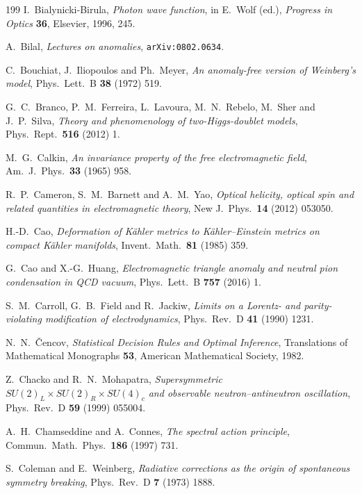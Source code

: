 \begin{thebibliography}{199}
 I.~Bialynicki-Birula, \emph{Photon wave function}, in E.~Wolf (ed.), \emph{Progress in Optics} \textbf{36}, Elsevier, 1996, 245.

 A.~Bilal, \emph{Lectures on anomalies}, \texttt{arXiv:0802.0634}.

 C.~Bouchiat, J.~Iliopoulos and Ph.~Meyer, \emph{An anomaly-free version of Weinberg's model}, Phys.~Lett.~B \textbf{38} (1972) 519.

 G.~C.~Branco, P.~M.~Ferreira, L.~Lavoura, M.~N.~Rebelo, M.~Sher and J.~P.~Silva, \emph{Theory and phenomenology of two-Higgs-doublet models},
Phys.~Rept.~\textbf{516} (2012) 1.

 M.~G.~Calkin, \emph{An invariance property of the free electromagnetic field}, Am.~J.~Phys.~\textbf{33} (1965) 958.

 R.~P.~Cameron, S.~M.~Barnett and A.~M.~Yao, \emph{Optical helicity, optical spin and related quantities in electromagnetic theory},
New J.~Phys.~\textbf{14} (2012) 053050.

 H.-D.~Cao, \emph{Deformation of K\"ahler metrics to K\"ahler--Einstein metrics on compact K\"ahler manifolds}, Invent.~Math.~\textbf{81} (1985) 359.

 G.~Cao and X.-G.~Huang, \emph{Electromagnetic triangle anomaly and neutral pion condensation in QCD vacuum}, Phys.~Lett.~B \textbf{757} (2016) 1.

 S.~M.~Carroll, G.~B.~Field and R.~Jackiw, \emph{Limits on a Lorentz- and parity-violating modification of electrodynamics},
Phys.~Rev.~D \textbf{41} (1990) 1231.

 N.~N.~\v{C}encov, \emph{Statistical Decision Rules and Optimal Inference}, Translations of Mathematical Monographs \textbf{53}, American Mathematical
Society, 1982.

 Z.~Chacko and R.~N.~Mohapatra, \emph{Supersymmetric $SU(2)_L\times SU(2)_R\times SU(4)_c$ and observable neutron--antineutron oscillation},
Phys.~Rev.~D \textbf{59} (1999) 055004.

 A.~H.~Chamseddine and A.~Connes, \emph{The spectral action principle}, Commun.~Math.~Phys.~\textbf{186} (1997) 731.

 S.~Coleman and E.~Weinberg, \emph{Radiative corrections as the origin of spontaneous symmetry breaking}, Phys.~Rev.~D \textbf{7} (1973) 1888.


\end{thebibliography}
